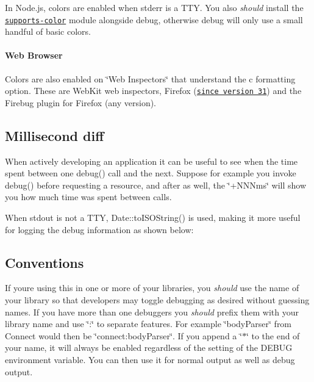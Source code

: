 In Node.\+js, colors are enabled when stderr is a T\+TY. You also {\itshape should} install the \href{https://npmjs.org/supports-color}{\tt {\ttfamily supports-\/color}} module alongside debug, otherwise debug will only use a small handful of basic colors.



\paragraph*{Web Browser}

Colors are also enabled on \char`\"{}\+Web Inspectors\char`\"{} that understand the {\ttfamily c} formatting option. These are Web\+Kit web inspectors, Firefox (\href{https://hacks.mozilla.org/2014/05/editable-box-model-multiple-selection-sublime-text-keys-much-more-firefox-developer-tools-episode-31/}{\tt since version 31}) and the Firebug plugin for Firefox (any version).



\subsection*{Millisecond diff}

When actively developing an application it can be useful to see when the time spent between one {\ttfamily debug()} call and the next. Suppose for example you invoke {\ttfamily debug()} before requesting a resource, and after as well, the \char`\"{}+\+N\+N\+Nms\char`\"{} will show you how much time was spent between calls.



When stdout is not a T\+TY, {\ttfamily Date\+::to\+I\+S\+O\+String()} is used, making it more useful for logging the debug information as shown below\+:



\subsection*{Conventions}

If you\textquotesingle{}re using this in one or more of your libraries, you {\itshape should} use the name of your library so that developers may toggle debugging as desired without guessing names. If you have more than one debuggers you {\itshape should} prefix them with your library name and use \char`\"{}\+:\char`\"{} to separate features. For example \char`\"{}body\+Parser\char`\"{} from Connect would then be \char`\"{}connect\+:body\+Parser\char`\"{}. If you append a \char`\"{}$\ast$\char`\"{} to the end of your name, it will always be enabled regardless of the setting of the D\+E\+B\+UG environment variable. You can then use it for normal output as well as debug output.

